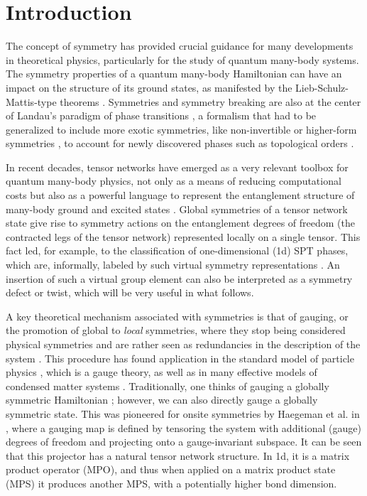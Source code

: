 \documentclass[reprint,
superscriptaddress,
amsmath,amssymb,
notitlepage,
aps,
prb,
10pt, 
tightenlines
]{revtex4-2}
\begin{document}
\maketitle

\section{Introduction}

The concept of symmetry has provided crucial guidance for many developments in theoretical physics, particularly for the study of quantum many-body systems. The symmetry properties of a quantum many-body Hamiltonian can have an impact on the structure of its ground states, as manifested by the Lieb-Schulz-Mattis-type theorems \cite{Lieb61, Oshikawa97, Tasaki_book, Fuji16, Po17, Ogata21, Tasaki22}. Symmetries and symmetry breaking are also at the center of Landau's paradigm of phase transitions \cite{Landau}, a formalism that had to be generalized to include more exotic symmetries, like non-invertible \cite{Bhardwaj24, Bhardwaj2024a, Bhardwaj25} or higher-form symmetries \cite{Iqbal22, Liu24}, to account for newly discovered phases such as topological orders \cite{Wen90}.

In recent decades, tensor networks have emerged as a very relevant toolbox for quantum many-body physics, not only as a means of reducing computational costs but also as a powerful language to represent the entanglement structure of many-body ground and excited states \cite{Review, TN_book}. Global symmetries of a tensor network state give rise to symmetry actions on the entanglement degrees of freedom (the contracted legs of the tensor network) represented locally on a single tensor. This fact led, for example, to the classification of one-dimensional (1d) SPT phases, which are, informally, labeled by such virtual symmetry representations \cite{Chen11a, Schuch11, string_order}. An insertion of such a virtual group element can also be interpreted as a symmetry defect or twist, which will be very useful in what follows.

A key theoretical mechanism associated with symmetries is that of gauging, or the promotion of global to {\it local} symmetries, where they stop being considered physical symmetries and are rather seen as redundancies in the description of the system \cite{Straumann00}. This procedure has found application in the standard model of particle physics \cite{YangMills54, Wu75, Englert64, Higgs64}, which is a gauge theory, as well as in many effective models of condensed matter systems \cite{Anderson63, Kleinert, Fr23}. Traditionally, one thinks of gauging a globally symmetric Hamiltonian \cite{Kogut75}; however, we can also directly gauge a globally symmetric state. This was pioneered for onsite symmetries by Haegeman et al. in \cite{PhysRevX.5.011024}, where a gauging map is defined by tensoring the system with additional (gauge) degrees of freedom and projecting onto a gauge-invariant subspace. It can be seen that this projector has a natural tensor network structure. In 1d, it is a matrix product operator (MPO), and thus when applied on a matrix product state (MPS) it produces another MPS, with a potentially higher bond dimension. 
\end{document}
